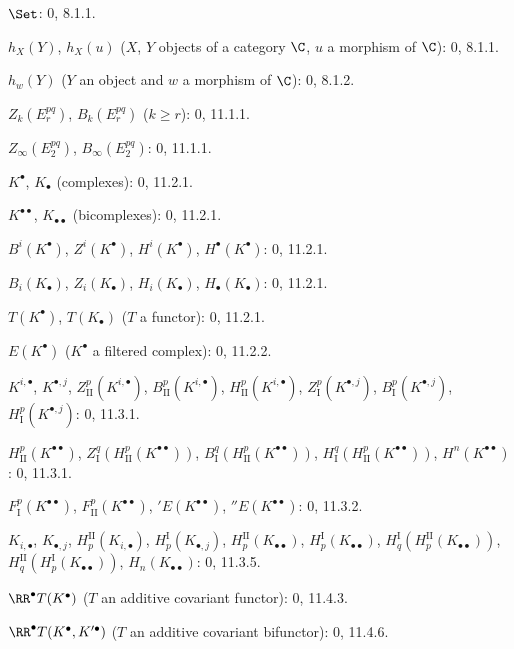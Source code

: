 \begin{flushleft}
$\Set$: 0, 8.1.1.

$h_X(Y)$, $h_X(u)$ ($X$, $Y$ objects of a category $\C$, $u$ a morphism
of $\C$): 0, 8.1.1.

$h_w(Y)$ ($Y$ an object and $w$ a morphism of $\C$): 0, 8.1.2.

$Z_k(E_r^{pq})$, $B_k(E_r^{pq})$ ($k\geq r$): 0, 11.1.1.

$Z_\infty(E_2^{pq})$, $B_\infty(E_2^{pq})$: 0, 11.1.1.

$K^\bullet$, $K_\bullet$ (complexes): 0, 11.2.1.

$K^{\bullet\bullet}$, $K_{\bullet\bullet}$ (bicomplexes): 0, 11.2.1.

$B^i(K^\bullet)$, $Z^i(K^\bullet)$, $H^i(K^\bullet)$,
$H^\bullet(K^\bullet)$: 0, 11.2.1.

$B_i(K_\bullet)$, $Z_i(K_\bullet)$, $H_i(K_\bullet)$,
$H_\bullet(K_\bullet)$: 0, 11.2.1.

$T(K^\bullet)$, $T(K_\bullet)$ ($T$ a functor): 0, 11.2.1.

$E(K^\bullet)$ ($K^\bullet$ a filtered complex): 0, 11.2.2.

$K^{i,\bullet}$, $K^{\bullet,j}$, $Z_{\mathrm{II}}^p(K^{i,\bullet})$,
$B_{\mathrm{II}}^p(K^{i,\bullet})$, $H_{\mathrm{II}}^p(K^{i,\bullet})$,
$Z_{\mathrm I}^p(K^{\bullet,j})$, $B_{\mathrm I}^p(K^{\bullet,j})$,
$H_{\mathrm I}^p(K^{\bullet,j})$: 0, 11.3.1.

$H_{\mathrm{II}}^p(K^{\bullet\bullet})$,
$Z_{\mathrm I}^q(H_{\mathrm{II}}^p(K^{\bullet\bullet}))$,
$B_{\mathrm I}^q(H_{\mathrm{II}}^p(K^{\bullet\bullet}))$,
$H_{\mathrm I}^q(H_{\mathrm{II}}^p(K^{\bullet\bullet}))$,
$H^n(K^{\bullet\bullet})$: 0, 11.3.1.

$F_{\mathrm I}^p(K^{\bullet\bullet})$,
$F_{\mathrm{II}}^p(K^{\bullet\bullet})$, ${}'E(K^{\bullet\bullet})$,
${}''E(K^{\bullet\bullet})$: 0, 11.3.2.

$K_{i,\bullet}$, $K_{\bullet,j}$, $H_p^{\mathrm{II}}(K_{i,\bullet})$,
$H_p^{\mathrm I}(K_{\bullet,j})$, $H_p^{\mathrm{II}}(K_{\bullet\bullet})$,
$H_p^{\mathrm I}(K_{\bullet\bullet})$,
$H_q^{\mathrm I}(H_p^{\mathrm{II}}(K_{\bullet\bullet}))$,
$H_q^{\mathrm{II}}(H_p^{\mathrm I}(K_{\bullet\bullet}))$,
$H_n(K_{\bullet\bullet})$: 0, 11.3.5.

$\RR^\bullet T(K^\bullet)$ ($T$ an additive covariant functor): 0, 11.4.3.

$\RR^\bullet T(K^\bullet,K'^{\bullet})$ ($T$ an additive covariant
bifunctor): 0, 11.4.6.


\end{flushleft}
